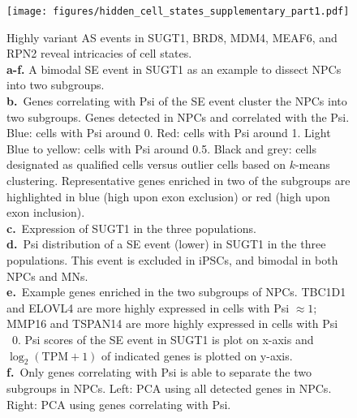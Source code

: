 \clearpage
\begin{figure}[h]
\ContinuedFloat
\captionsetup{labelformat=empty}
\centering
\texttt{[image: figures/hidden\_cell\_states\_supplementary\_part1.pdf]}
\end{figure}
\clearpage


\clearpage
\thispagestyle{facingcaption}
\begin{figure}[h]
\captionsetup{labelformat=prev-page}
\caption[Highly variant AS events in SUGT1, BRD8, MDM4, MEAF6, and RPN2 reveal intricacies of cell states.]{
Highly variant AS events in SUGT1, BRD8, MDM4, MEAF6, and RPN2 reveal intricacies of cell states.\\
\textbf{a-f.} A bimodal SE event in SUGT1 as an example to dissect NPCs into two subgroups.\\
\textbf{b.}~Genes correlating with Psi of the SE event cluster the NPCs into two subgroups. Genes detected in NPCs and correlated with the Psi. Blue: cells with Psi around 0. Red: cells with Psi around 1. Light Blue to yellow: cells with Psi around 0.5. Black and grey: cells designated as qualified cells versus outlier cells based on $k$-means clustering. Representative genes enriched in two of the subgroups are highlighted in blue (high upon exon exclusion) or red (high upon exon inclusion). \\
\textbf{c.}~Expression of SUGT1 in the three populations.\\
\textbf{d.}~Psi distribution of a SE event (lower) in SUGT1 in the three populations. This event is excluded in iPSCs, and bimodal in both NPCs and MNs.\\
\textbf{e.}~Example genes enriched in the two subgroups of NPCs. TBC1D1 and ELOVL4 are more highly expressed in cells with Psi $\approx 1$; MMP16 and TSPAN14 are more highly expressed in cells with Psi ~0. Psi scores of the SE event in SUGT1 is plot on x-axis and $\log_2(\mathrm{TPM}+1)$ of indicated genes is plotted on y-axis.\\
\textbf{f.}~Only genes correlating with Psi is able to separate the two subgroups in NPCs. Left: PCA using all detected genes in NPCs. Right: PCA using genes correlating with Psi.\\
}
\end{figure}
